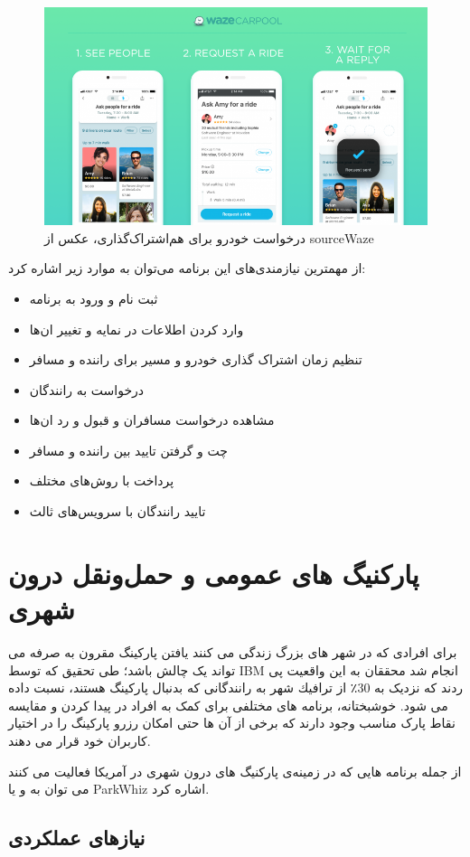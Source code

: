 \begin{figure}[hbt]
\centering
\includegraphics[scale=0.5]{waze1.png}
\caption{درخواست خودرو برای هم‌اشتراک‌گذاری، عکس از sourceWaze}
\label{fig: waze1}
\end{figure}

از مهمترین نیازمندی‌های این برنامه می‌توان به موارد زیر اشاره کرد:

\begin{itemize}
\item
ثبت نام و ورود به برنامه
\item
وارد کردن اطلاعات در نمایه و تغییر ان‌ها
\item
تنظیم زمان اشتراک گذاری خودرو و مسیر برای راننده و مسافر
\item
درخواست به رانندگان 
\item
مشاهده درخواست مسافران و قبول و رد ان‌ها 
\item
چت و گرفتن تایید بین راننده و مسافر
\item 
پرداخت با روش‌های مختلف
\item
تایید رانندگان با سرویس‌های ثالث 
\end{itemize}


\section{پارکنیگ های عمومی و حمل‌و‌نقل درون شهری}
برای افرادی که در شهر های بزرگ زندگی می کنند یافتن پارکینگ مقرون به صرفه می تواند یک چالش باشد؛ طی تحقیق که توسط IBM انجام شد محققان به این واقعیت پی ردند که نزدیک به  30٪ از ترافیك شهر به رانندگانی كه بدنبال پارکینگ هستند، نسبت داده می شود. خوشبختانه، برنامه های مختلفی برای کمک به افراد در پیدا کردن و مقایسه نقاط پارک مناسب وجود دارند که برخی از آن ها حتی امکان رزرو پارکینگ را در اختیار کاربران خود قرار می دهند.

از جمله برنامه هایی که در زمینه‌ی پارکنیگ های درون شهری در آمریکا فعالیت می کنند می توان به  و یا ParkWhiz اشاره کرد.


\subsection{نیازهای عملکردی }


















